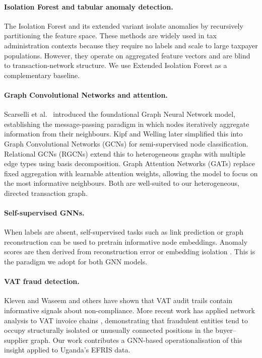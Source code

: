 \documentclass[10pt,twocolumn]{article}
\begin{document}
\paragraph{Isolation Forest and tabular anomaly detection.}
The Isolation Forest \cite{liu2008isolation} and its extended variant \cite{hariri2019extended}
isolate anomalies by recursively partitioning the feature space. These methods
are widely used in tax administration contexts \cite{phua2010survey} because
they require no labels and scale to large taxpayer populations. However, they
operate on aggregated feature vectors and are blind to transaction-network
structure. We use Extended Isolation Forest as a complementary baseline.

\paragraph{Graph Convolutional Networks and attention.}
Scarselli et al.\ \cite{scarselli2009gnn} introduced the foundational Graph
Neural Network model, establishing the message-passing paradigm in which nodes
iteratively aggregate information from their neighbours. Kipf and Welling
\cite{kipf2017semi} later simplified this into Graph Convolutional Networks
(GCNs) for semi-supervised node classification. Relational GCNs
(RGCNs) \cite{schlichtkrull2018modeling} extend this to heterogeneous graphs
with multiple edge types using basis decomposition. Graph Attention Networks
(GATs) \cite{velickovic2018graph} replace fixed aggregation with
learnable attention weights, allowing the model to focus on the most
informative neighbours. Both are well-suited to our heterogeneous, directed
transaction graph.

\paragraph{Self-supervised GNNs.}
When labels are absent, self-supervised tasks such as link prediction
\cite{hamilton2017inductive} or graph reconstruction can be used to pretrain
informative node embeddings. Anomaly scores are then derived from reconstruction
error or embedding isolation \cite{liu2021anomaly}. This is the paradigm we
adopt for both GNN models.

\paragraph{VAT fraud detection.}
Kleven and Waseem \cite{kleven2013using} and others have shown that VAT
audit trails contain informative signals about non-compliance. More recent
work has applied network analysis to VAT invoice chains \cite{pomer2019tax,
batista2023detecting}, demonstrating that fraudulent entities tend to occupy
structurally isolated or unusually connected positions in the buyer--supplier
graph. Our work contributes a GNN-based operationalisation of this insight
applied to Uganda's EFRIS data.
\end{document}
